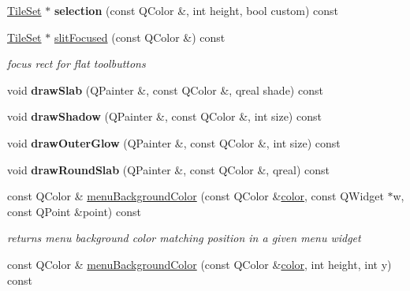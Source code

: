 \begin{Indent}
\begin{DoxyCompactItemize}
\hyperlink{class_tile_set}{Tile\+Set} $\ast$ {\bfseries selection} (const Q\+Color \&, int height, bool custom) const
\item 
\mbox{\label{class_style_helper_adef81a3a34e5107044f53ef9af6b93c7}} 
\hyperlink{class_tile_set}{Tile\+Set} $\ast$ \hyperlink{class_style_helper_adef81a3a34e5107044f53ef9af6b93c7}{slit\+Focused} (const Q\+Color \&) const
\begin{DoxyCompactList}\small\item\em focus rect for flat toolbuttons \end{DoxyCompactList}\item 
\mbox{\label{class_style_helper_ad33cb4e1aa39e9e8efe6408e5bd086da}} 
void {\bfseries draw\+Slab} (Q\+Painter \&, const Q\+Color \&, qreal shade) const
\item 
\mbox{\label{class_style_helper_a7c252e9ba50cdff0f81076ace98d42e8}} 
void {\bfseries draw\+Shadow} (Q\+Painter \&, const Q\+Color \&, int size) const
\item 
\mbox{\label{class_style_helper_a406e1324b384c16852b4a6385f9d4fc5}} 
void {\bfseries draw\+Outer\+Glow} (Q\+Painter \&, const Q\+Color \&, int size) const
\item 
\mbox{\label{class_style_helper_a098d5e17f5b7c66f6ee249c92ead1017}} 
void {\bfseries draw\+Round\+Slab} (Q\+Painter \&, const Q\+Color \&, qreal) const
\item 
\mbox{\label{class_style_helper_ade268ce8080a288a98f20bf2087c969c}} 
const Q\+Color \& \hyperlink{class_style_helper_ade268ce8080a288a98f20bf2087c969c}{menu\+Background\+Color} (const Q\+Color \&\hyperlink{structcolor}{color}, const Q\+Widget $\ast$w, const Q\+Point \&point) const
\begin{DoxyCompactList}\small\item\em returns menu background color matching position in a given menu widget \end{DoxyCompactList}\item 
\mbox{\label{class_style_helper_ae55c93001b07e42e8ce887a09139a714}} 
const Q\+Color \& \hyperlink{class_style_helper_ae55c93001b07e42e8ce887a09139a714}{menu\+Background\+Color} (const Q\+Color \&\hyperlink{structcolor}{color}, int height, int y) const

\end{DoxyCompactItemize}
\end{Indent}
